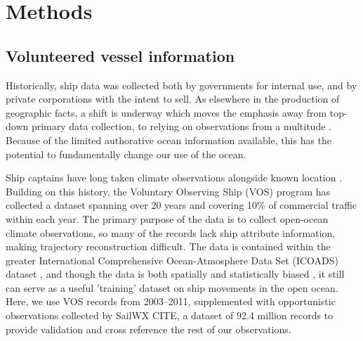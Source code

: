 \section{\textbf{Methods}}



\subsection{Volunteered vessel information}


Historically, ship data was collected both by governments for internal use, and by private corporations with the intent to sell. As elsewhere in the production of geographic facts, a shift is underway which moves the emphasis away from top-down primary data collection, to relying on observations from a multitude \citep{goodchild1999cartographic,goodchild2007citizens,elwood2011researching}. Because of the limited authorative ocean information available, this has the potential to fundamentally change our use of the ocean.

Ship captains have long taken climate observations alongside known location \cite{brohan2009marine}.  Building on this history, the Voluntary Observing Ship (VOS) \citep{VOSOverview} program has collected a dataset spanning over 20 years and covering 10\% of commercial traffic within each year. The primary purpose of the data is to collect open-ocean climate observations, so many of the records lack ship attribute information, making trajectory reconstruction difficult. The data is contained within the greater International Comprehensive Ocean-Atmosphere Data Set (ICOADS) dataset \cite{woodruff2010icoads}, and though the data is both spatially and statistically biased \citep{Wang2007}, it still can serve as a useful 'training' dataset on ship movements in the open ocean. Here, we use VOS records from 2003--2011, supplemented with opportunistic observations collected by SailWX CITE, a dataset of 92.4 million records to provide validation and cross reference the rest of our observations. %


